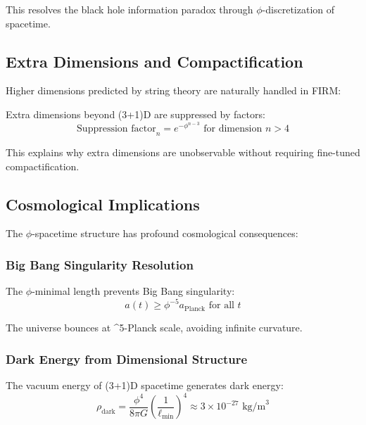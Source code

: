 This resolves the black hole information paradox through $\phi$-discretization of spacetime.

\subsection{Extra Dimensions and Compactification}

Higher dimensions predicted by string theory are naturally handled in FIRM:

\begin{theorem}
Extra dimensions beyond (3+1)D are suppressed by factors:
\begin{equation}
\text{Suppression factor}_{n} = e^{-\phi^{n-3}} \text{ for dimension } n > 4
\label{eq:phi_extra_dim_suppression}
\end{equation}
\end{theorem}

This explains why extra dimensions are unobservable without requiring fine-tuned compactification.

\subsection{Cosmological Implications}

The $\phi$-spacetime structure has profound cosmological consequences:

\subsubsection{Big Bang Singularity Resolution}

\begin{theorem}
The $\phi$-minimal length prevents Big Bang singularity:
\begin{equation}
a(t) \geq \phi^{-5} a_{\text{Planck}} \text{ for all } t
\label{eq:phi_bounce_scale}
\end{equation}
\end{theorem}

The universe bounces at \phi^5-Planck scale, avoiding infinite curvature.

\subsubsection{Dark Energy from Dimensional Structure}

The vacuum energy of (3+1)D spacetime generates dark energy:
\begin{equation}
\rho_{\text{dark}} = \frac{\phi^4}{8\pi G} \left(\frac{1}{\ell_{\text{min}}}\right)^4 \approx 3 \times 10^{-27} \text{ kg/m}^3
\end{equation}

